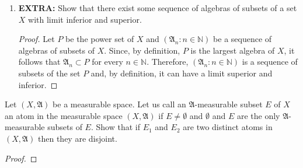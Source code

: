 \documentclass[12pt]{article}
\newcommand{\N}{\mathbb{N}}
\newenvironment{problem}[2][Problem]{\begin{trivlist}
		\item[\hskip \labelsep {\bfseries #1}\hskip \labelsep {\bfseries #2.}]}{\end{trivlist}}
\begin{document}
\begin{problem}{1.11}
\begin{enumerate}[label=\textbf{(\alph*)}]
	\item \textbf{EXTRA:} Show that there exist some sequence of algebras of subsets of a set $X$ with limit inferior and superior. 
	\begin{proof}
		Let $P$ be the power set of $X$ and $\left(\mathfrak{A}_{n}:n\in \N\right)$ be a sequence of algebras of subsets of $X$. Since, by definition, $P$ is the largest algebra of $X$, it follows that $\mathfrak{A}_{n} \subset P$ for every $n\in \N$. Therefore, $\left(\mathfrak{A}_{n}:n\in \N\right)$ is a sequence of subsets of the set $P$ and, by definition, it can have a limit superior and inferior.
	\end{proof}
		\end{enumerate}
\end{problem}

\begin{problem}{1.12}
	Let $(X,\mathfrak{A})$ be a measurable space. Let us call an $\mathfrak{A}$-measurable subset $E$ of $X$ an atom in the measurable space $(X,\mathfrak{A})$ if $E\neq \emptyset$ and $\emptyset$ and $E$ are the only $\mathfrak{A}$-measurable subsets of $E$. Show that if $E_{1}$ and $E_{2}$ are two distinct atoms in $(X,\mathfrak{A})$ then they are disjoint.
	\begin{proof}
		 
	\end{proof}
\end{problem}
\end{document}
